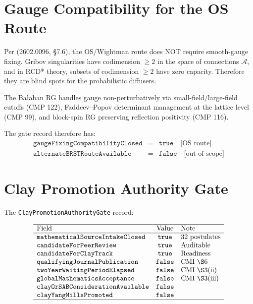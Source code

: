 \documentclass[11pt,a4paper]{article}
\begin{document}
\section{Gauge Compatibility for the OS Route}

Per (2602.0096, \S7.6), the OS/Wightman route does NOT require smooth-gauge
fixing.  Gribov singularities have codimension $\geq 2$ in the space of
connections $\mathcal{A}$, and in RCD* theory, subsets of codimension $\geq 2$
have zero capacity.  Therefore they are blind spots for the probabilistic
diffusers.

The Ba{\l}aban RG handles gauge non-perturbatively via small-field/large-field
cutoffs (CMP 122), Faddeev--Popov determinant management at the lattice level
(CMP 99), and block-spin RG preserving reflection positivity (CMP 116).

The gate record therefore has:
\[
\begin{array}{lcl}
\texttt{gaugeFixingCompatibilityClosed} & = & \texttt{true} \quad \text{[OS route]} \\
\texttt{alternateBRSTRouteAvailable} & = & \texttt{false} \quad \text{[out of scope]}
\end{array}
\]

\section{Clay Promotion Authority Gate}

The \texttt{ClayPromotionAuthorityGate} record:

\[
\begin{array}{lcl}
\hline
\text{Field} & \text{Value} & \text{Note} \\
\hline
\texttt{mathematicalSourceIntakeClosed} & \texttt{true} & \text{32 postulates} \\
\texttt{candidateForPeerReview} & \texttt{true} & \text{Auditable} \\
\texttt{candidateForClayTrack} & \texttt{true} & \text{Readiness} \\
\texttt{qualifyingJournalPublication} & \texttt{false} & \text{CMI \S6} \\
\texttt{twoYearWaitingPeriodElapsed} & \texttt{false} & \text{CMI \S3(ii)} \\
\texttt{globalMathematicsAcceptance} & \texttt{false} & \text{CMI \S3(iii)} \\
\texttt{clayOrSABConsiderationAvailable} & \texttt{false} & \\
\texttt{clayYangMillsPromoted} & \texttt{false} & \\
\hline
\end{array}
\]
\end{document}
